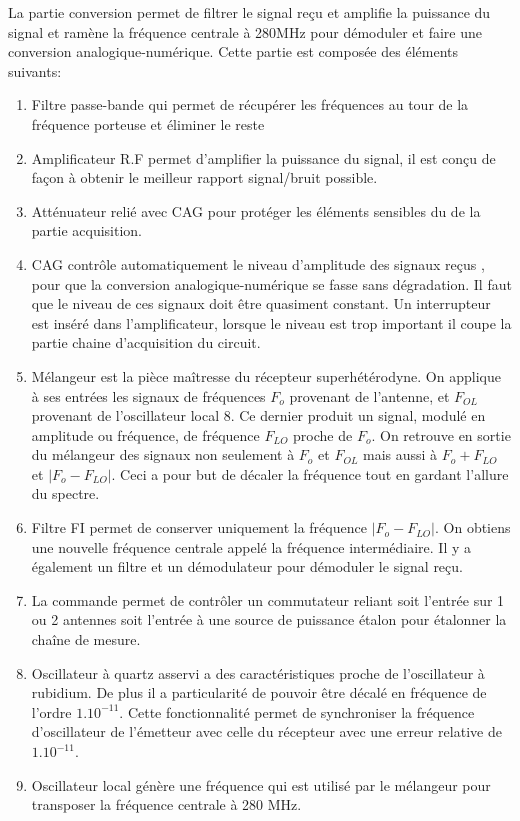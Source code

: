 La partie conversion permet de filtrer le signal reçu et amplifie la puissance du signal et ramène la fréquence centrale à 280MHz pour démoduler et faire une conversion analogique-numérique.
Cette partie est composée des éléments suivants:
\begin{enumerate}
\item Filtre passe-bande qui permet de récupérer les fréquences au tour de la fréquence porteuse et éliminer le reste
\item Amplificateur R.F permet d'amplifier la puissance du signal, il est conçu de façon à obtenir le meilleur rapport signal/bruit possible.
\item Atténuateur relié avec CAG pour protéger les éléments sensibles du de la partie acquisition.
\item CAG contrôle automatiquement le niveau d'amplitude des signaux reçus , pour que la conversion analogique-numérique se fasse sans dégradation. Il faut que le niveau de ces signaux doit être quasiment constant. Un interrupteur est inséré dans l'amplificateur, lorsque le niveau est trop important il coupe la partie chaine d'acquisition du circuit. 
\item Mélangeur est la pièce maîtresse du récepteur superhétérodyne. On applique à ses entrées les signaux de fréquences $F_{o}$ provenant de l'antenne, et $F_{OL}$ provenant de l'oscillateur local 8. Ce dernier produit un signal, modulé en amplitude ou fréquence, de fréquence $ F_{LO}$ proche de $ F_{o}$. On retrouve en sortie du mélangeur des signaux non seulement à $ F_{o}$ et $ F_{OL}$ mais aussi à $ F_{o}+F_{LO}$ et $ |F_{o}-F_{LO}|$. Ceci a pour but de décaler la fréquence tout en gardant l'allure du spectre.
\item Filtre FI permet de conserver uniquement la fréquence $ |F_{o}-F_{LO}|$. On obtiens une nouvelle fréquence centrale appelé la fréquence intermédiaire. Il y a également un filtre et un démodulateur pour démoduler le signal reçu.
\item La commande permet de contrôler un commutateur reliant soit l'entrée sur 1 ou 2 antennes soit l'entrée à une source de puissance étalon pour étalonner la chaîne de mesure. 
\item Oscillateur à quartz asservi a des caractéristiques proche de l'oscillateur à rubidium. De plus il a particularité de pouvoir être décalé en fréquence de l'ordre $1.10^{-11}$. Cette fonctionnalité permet de synchroniser la fréquence d'oscillateur de l'émetteur avec celle du récepteur avec une erreur relative de $1.10^{-11}$. 
\item Oscillateur local génère une fréquence qui est utilisé par le mélangeur pour transposer la fréquence centrale à 280 MHz.


\end{enumerate}


